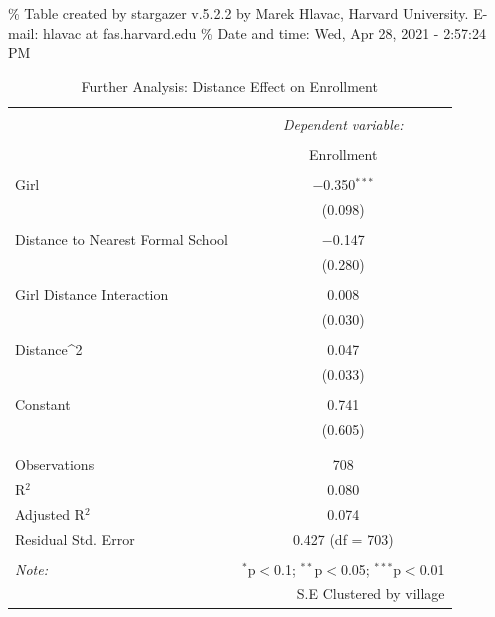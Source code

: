 \documentclass[
]{article}
\begin{document}
\% Table created by stargazer v.5.2.2 by Marek Hlavac, Harvard
University. E-mail: hlavac at fas.harvard.edu \% Date and time: Wed, Apr
28, 2021 - 2:57:24 PM

\begin{table}[!htbp] \centering 
  \caption{Further Analysis: Distance Effect on Enrollment} 
  \label{} 
\begin{tabular}{@{\extracolsep{5pt}}lc} 
\\[-1.8ex]\hline 
\hline \\[-1.8ex] 
 & \multicolumn{1}{c}{\textit{Dependent variable:}} \\ 
\cline{2-2} 
\\[-1.8ex] & Enrollment \\ 
\hline \\[-1.8ex] 
 Girl & $-$0.350$^{***}$ \\ 
  & (0.098) \\ 
  & \\ 
 Distance to Nearest Formal School & $-$0.147 \\ 
  & (0.280) \\ 
  & \\ 
 Girl Distance Interaction & 0.008 \\ 
  & (0.030) \\ 
  & \\ 
 Distance^2 & 0.047 \\ 
  & (0.033) \\ 
  & \\ 
 Constant & 0.741 \\ 
  & (0.605) \\ 
  & \\ 
\hline \\[-1.8ex] 
Observations & 708 \\ 
R$^{2}$ & 0.080 \\ 
Adjusted R$^{2}$ & 0.074 \\ 
Residual Std. Error & 0.427 (df = 703) \\ 
\hline 
\hline \\[-1.8ex] 
\textit{Note:}  & \multicolumn{1}{r}{$^{*}$p$<$0.1; $^{**}$p$<$0.05; $^{***}$p$<$0.01} \\ 
 & \multicolumn{1}{r}{S.E Clustered by village} \\ 
\end{tabular} 
\end{table}
\end{document}
